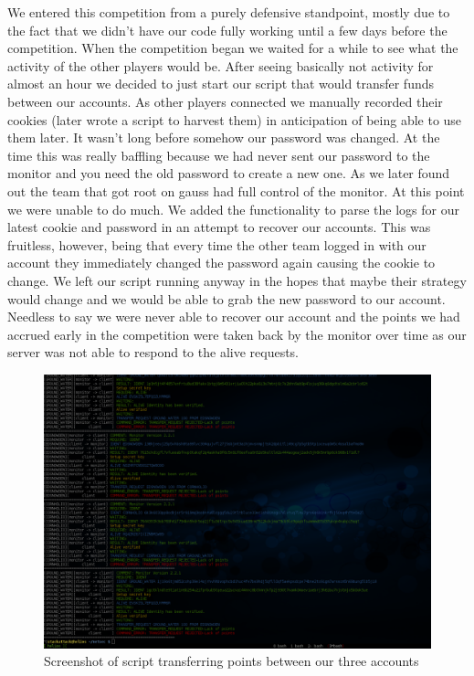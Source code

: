 \documentclass[10pt]{article}
\begin{document}
We entered this competition from a purely defensive standpoint, mostly due to
the fact that we didn't have our code fully working until a few days before the
competition. When the competition began we waited for a while to see what the
activity of the other players would be. After seeing basically not activity for
almost an hour we decided to just start our script that would transfer funds
between our accounts. As other players connected we manually recorded their
cookies (later wrote a script to harvest them) in anticipation of being able to
use them later. It wasn't long before somehow our password was changed. At the
time this was really baffling because we had never sent our password to the
monitor and you need the old password to create a new one. As we later found
out the team that got root on gauss had full control of the monitor. At this
point we were unable to do much. We added the functionality to parse the logs
for our latest cookie and password in an attempt to recover our accounts. This
was fruitless, however, being that every time the other team logged in with our
account they immediately changed the password again causing the cookie to
change.  We left our script running anyway in the hopes that maybe their
strategy would change and we would be able to grab the new password to our
account. Needless to say we were never able to recover our account and the
points we had accrued early in the competition were taken back by the monitor
over time as our server was not able to respond to the alive requests.

\vfill
\begin{figure}[H]
    \centering
    \includegraphics[width=\linewidth]{./log.png}
    \caption{Screenshot of script transferring points between our three accounts}
\end{figure}
\vfill
\end{document}
